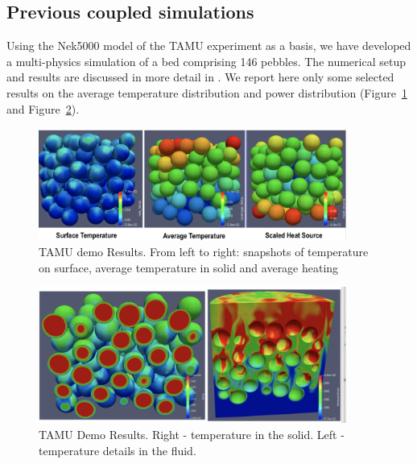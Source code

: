 \subsection{Previous coupled simulations}
\label{ss:c4}

Using the Nek5000 model of the TAMU experiment as a basis, we have developed a multi-physics simulation of a bed comprising 146 pebbles. The numerical setup and results are discussed in more detail in \cite{cardinal}. We report here only some selected results on the average temperature distribution and power distribution (Figure~\ref{f:dtamu1} and Figure~\ref{f:dtamu2}).

\begin{figure}[!h]
\centering
\includegraphics[clip=true,width=0.9\textwidth]{Figures/demo_r1}
\caption{TAMU demo Results. From left to right: snapshots of temperature on surface, average temperature in solid and average heating}
\label{f:dtamu1}
\end{figure}

\begin{figure}[!h]
\centering
\includegraphics[clip=true,width=0.9\textwidth]{Figures/demo_r2}
\caption{TAMU Demo Results. Right - temperature in the solid. Left - temperature details in the fluid.}
\label{f:dtamu2}
\end{figure}
